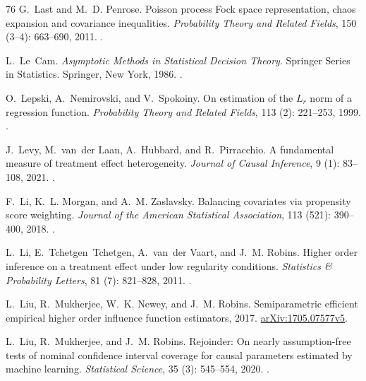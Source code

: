 \documentclass[12pt,oneside,openany]{book}
\numberwithin{equation}{chapter}
\theoremstyle{plain}
\theoremstyle{definition}
\theoremstyle{remark}
\begin{document}
\begin{thebibliography}{76}
G.~Last and M.~D. Penrose.
\newblock Poisson process {Fock} space representation, chaos expansion and
  covariance inequalities.
\newblock \emph{Probability Theory and Related Fields}, 150
  (3--4): 663--690, 2011.
\newblock {}.

L.~Le~Cam.
\newblock \emph{Asymptotic Methods in Statistical Decision Theory}.
\newblock Springer Series in Statistics. Springer, New York, 1986.
\newblock {}.

O.~Lepski, A.~Nemirovski, and V.~Spokoiny.
\newblock On estimation of the {$L_r$} norm of a regression function.
\newblock \emph{Probability Theory and Related Fields}, 113
  (2): 221--253, 1999.
\newblock {}.

J.~Levy, M.~van~der Laan, A.~Hubbard, and R.~Pirracchio.
\newblock A fundamental measure of treatment effect heterogeneity.
\newblock \emph{Journal of Causal Inference}, 9 (1): 83--108,
  2021.
\newblock {}.

F.~Li, K.~L. Morgan, and A.~M. Zaslavsky.
\newblock Balancing covariates via propensity score weighting.
\newblock \emph{Journal of the American Statistical Association}, 113
  (521): 390--400, 2018.
\newblock {}.

L.~Li, E.~Tchetgen~Tchetgen, A.~van~der Vaart, and J.~M. Robins.
\newblock Higher order inference on a treatment effect under low regularity
  conditions.
\newblock \emph{Statistics \& Probability Letters}, 81 (7):
  821--828, 2011.
\newblock {}.

L.~Liu, R.~Mukherjee, W.~K. Newey, and J.~M. Robins.
\newblock Semiparametric efficient empirical higher order influence function
  estimators, 2017.
\newblock \href{https://arxiv.org/abs/1705.07577v5}{arXiv:1705.07577v5}.

L.~Liu, R.~Mukherjee, and J.~M. Robins.
\newblock Rejoinder: {On} nearly assumption-free tests of nominal confidence
  interval coverage for causal parameters estimated by machine learning.
\newblock \emph{Statistical Science}, 35 (3): 545--554, 2020.
\newblock {}.


\end{thebibliography}
\end{document}
